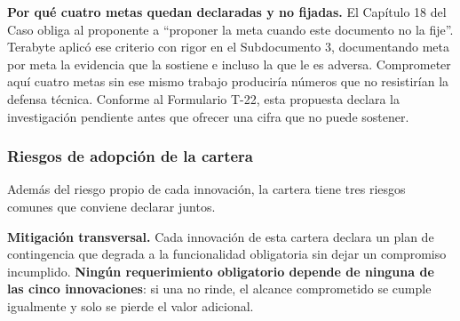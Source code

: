 \begin{bloqueSupuesto}
\textbf{Por qué cuatro metas quedan declaradas y no fijadas.} El Capítulo 18
del Caso obliga al proponente a \enquote{proponer la meta cuando este documento
no la fije}. Terabyte aplicó ese criterio con rigor en el Subdocumento 3,
documentando meta por meta la evidencia que la sostiene e incluso la que le es
adversa. Comprometer aquí cuatro metas sin ese mismo trabajo produciría números
que no resistirían la defensa técnica. Conforme al Formulario T-22, esta
propuesta declara la investigación pendiente antes que ofrecer una cifra que no
puede sostener.
\end{bloqueSupuesto}

\subsubsection{Riesgos de adopción de la cartera}

Además del riesgo propio de cada innovación, la cartera tiene tres riesgos
comunes que conviene declarar juntos.

\begin{riesgo}[R-INN-01]
\end{riesgo}

\begin{riesgo}[R-INN-02]
\end{riesgo}

\begin{riesgo}[R-INN-03]
\end{riesgo}

\begin{bloquePropuesta}
\textbf{Mitigación transversal.} Cada innovación de esta cartera declara un
plan de contingencia que degrada a la funcionalidad obligatoria sin dejar un
compromiso incumplido. \textbf{Ningún requerimiento obligatorio depende de
ninguna de las cinco innovaciones}: si una no rinde, el alcance comprometido se
cumple igualmente y solo se pierde el valor adicional.
\end{bloquePropuesta}

